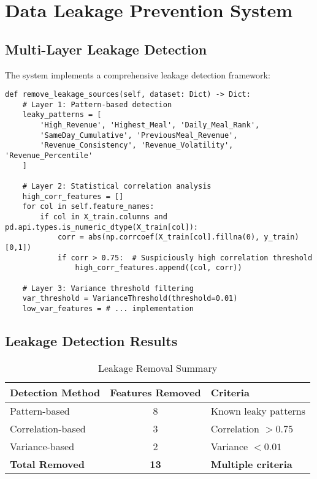 \documentclass[12pt,a4paper]{article}
\begin{document}
\section{Data Leakage Prevention System}

\subsection{Multi-Layer Leakage Detection}

The system implements a comprehensive leakage detection framework:

\begin{lstlisting}[caption=Leakage Detection Algorithm]
def remove_leakage_sources(self, dataset: Dict) -> Dict:
    # Layer 1: Pattern-based detection
    leaky_patterns = [
        'High_Revenue', 'Highest_Meal', 'Daily_Meal_Rank', 
        'SameDay_Cumulative', 'PreviousMeal_Revenue',
        'Revenue_Consistency', 'Revenue_Volatility', 'Revenue_Percentile'
    ]
    
    # Layer 2: Statistical correlation analysis
    high_corr_features = []
    for col in self.feature_names:
        if col in X_train.columns and pd.api.types.is_numeric_dtype(X_train[col]):
            corr = abs(np.corrcoef(X_train[col].fillna(0), y_train)[0,1])
            if corr > 0.75:  # Suspiciously high correlation threshold
                high_corr_features.append((col, corr))
    
    # Layer 3: Variance threshold filtering
    var_threshold = VarianceThreshold(threshold=0.01)
    low_var_features = # ... implementation
\end{lstlisting}

\subsection{Leakage Detection Results}

\begin{table}[h]
\centering
\begin{tabular}{@{}lcl@{}}
\toprule
\textbf{Detection Method} & \textbf{Features Removed} & \textbf{Criteria} \\
\midrule
Pattern-based & 8 & Known leaky patterns \\
Correlation-based & 3 & Correlation $> 0.75$ \\
Variance-based & 2 & Variance $< 0.01$ \\
\midrule
\textbf{Total Removed} & \textbf{13} & \textbf{Multiple criteria} \\
\bottomrule
\end{tabular}
\caption{Leakage Removal Summary}
\end{table}
\end{document}
